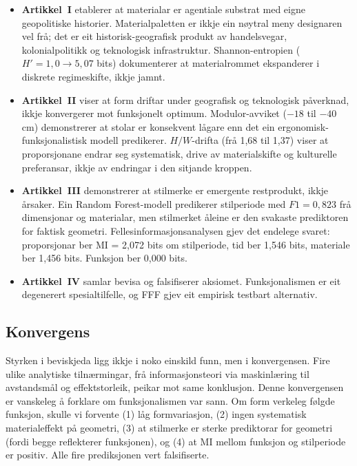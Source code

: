 \documentclass[10pt, a4paper, twocolumn]{article}
\begin{document}
\begin{itemize}
  \item \textbf{Artikkel~I} etablerer at materialar er agentiale substrat med eigne geopolitiske historier. Materialpaletten er ikkje ein nøytral meny designaren vel frå; det er eit historisk-geografisk produkt av handelsvegar, kolonialpolitikk og teknologisk infrastruktur. Shannon-entropien ($H' = 1{,}0 \rightarrow 5{,}07$ bits) dokumenterer at materialrommet ekspanderer i diskrete regimeskifte, ikkje jamnt.
  \item \textbf{Artikkel~II} viser at form driftar under geografisk og teknologisk påverknad, ikkje konvergerer mot funksjonelt optimum. Modulor-avviket ($-18$ til $-40$ cm) demonstrerer at stolar er konsekvent lågare enn det ein ergonomisk-funksjonalistisk modell predikerer. $H/W$-drifta (frå 1,68 til 1,37) viser at proporsjonane endrar seg systematisk, drive av materialskifte og kulturelle preferansar, ikkje av endringar i den sitjande kroppen.
  \item \textbf{Artikkel~III} demonstrerer at stilmerke er emergente restprodukt, ikkje årsaker. Ein Random Forest-modell predikerer stilperiode med $F1 = 0{,}823$ frå dimensjonar og materialar, men stilmerket åleine er den svakaste prediktoren for faktisk geometri. Fellesinformasjonsanalysen gjev det endelege svaret: proporsjonar ber MI = 2,072 bits om stilperiode, tid ber 1,546 bits, materiale ber 1,456 bits. Funksjon ber 0,000 bits.
  \item \textbf{Artikkel~IV} samlar bevisa og falsifiserer aksiomet. Funksjonalismen er eit degenerert spesialtilfelle, og FFF gjev eit empirisk testbart alternativ.
\end{itemize}

\subsection{Konvergens}

Styrken i beviskjeda ligg ikkje i noko einskild funn, men i konvergensen. Fire ulike analytiske tilnærmingar, frå informasjonsteori via maskinlæring til avstandsmål og effektstorleik, peikar mot same konklusjon. Denne konvergensen er vanskeleg å forklare om funksjonalismen var sann. Om form verkeleg følgde funksjon, skulle vi forvente (1) låg formvariasjon, (2) ingen systematisk materialeffekt på geometri, (3) at stilmerke er sterke prediktorar for geometri (fordi begge reflekterer funksjonen), og (4) at MI mellom funksjon og stilperiode er positiv. Alle fire prediksjonen vert falsifiserte.
\end{document}
